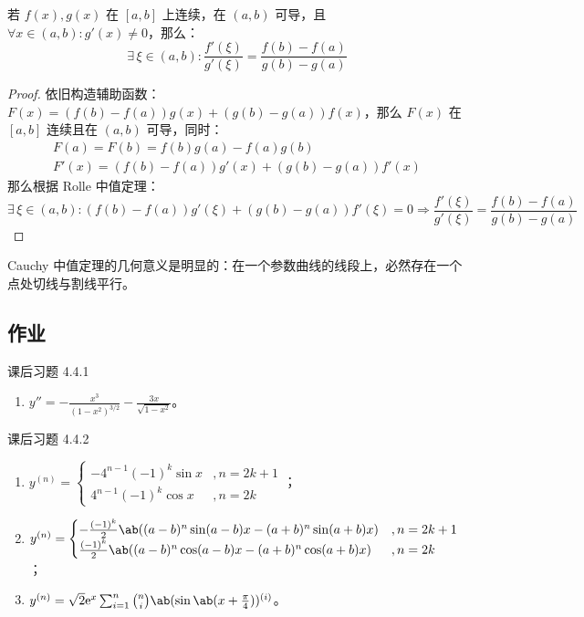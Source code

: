 \begin{theorem}
	若 $f(x), g(x)$ 在 $[a, b]$ 上连续，在 $(a, b)$ 可导，且 $\forall x \in (a, b): g'(x) \neq 0$，那么：
	$$
	\exists\,\xi \in (a, b): \frac{f'(\xi)}{g'(\xi)} = \frac{f(b) - f(a)}{g(b) - g(a)}
	$$

	\begin{proof}
		依旧构造辅助函数：$F(x) = (f(b) - f(a)) g(x) + (g(b) - g(a)) f(x)$，那么 $F(x)$ 在 $[a, b]$ 连续且在 $(a, b)$ 可导，同时：
		$$
		\begin{gathered}
			F(a) = F(b) = f(b) g(a) - f(a) g(b) \\
			F'(x) = (f(b) - f(a)) g'(x) + (g(b) - g(a)) f'(x)
		\end{gathered}
		$$
		那么根据 Rolle 中值定理：
		$$
		\exists\,\xi \in (a, b): (f(b) - f(a)) g'(\xi) + (g(b) - g(a)) f'(\xi) = 0 \Rightarrow \frac{f'(\xi)}{g'(\xi)} = \frac{f(b) - f(a)}{g(b) - g(a)}
		$$
	\end{proof}
\end{theorem}

Cauchy 中值定理的几何意义是明显的：在一个参数曲线的线段上，必然存在一个点处切线与割线平行。

\subsection{作业}

\begin{problem}
	课后习题 4.4.1

	\begin{solution}
		\begin{enumerate}
			\item[\textbf{1)}] $y'' = -\frac{x^3}{(1 - x^2)^{3/2}} - \frac{3x}{\sqrt{1 - x^2}}$。
		\end{enumerate}
	\end{solution}
\end{problem}

\begin{problem}
	课后习题 4.4.2
	
	\begin{solution}
		\begin{enumerate}
			\item[\textbf{3)}] $y^{(n)} = \begin{cases}
				-4^{n-1} (-1)^k \sin x & , n = 2k + 1 \\
				4^{n-1} (-1)^k \cos x & , n = 2k 
			\end{cases}$；
			\item[\textbf{5)}] $y^{(n)} = \begin{cases}
				-\frac{(-1)^k}{2} \ab((a - b)^n \sin (a - b)x - (a + b)^n \sin (a + b)x) & , n = 2k + 1 \\
				\frac{(-1)^k}{2} \ab((a - b)^n \cos (a - b)x - (a + b)^n \cos (a + b)x) & , n = 2k
			\end{cases}$；
			\item[\textbf{7)}] $y^{(n)} = \sqrt 2 \E^x \sum_{i=1}^n \binom{n}{i} \ab(\sin \ab(x + \frac{\pi}{4}))^{(i)}$。
		\end{enumerate}
	\end{solution}
\end{problem}

